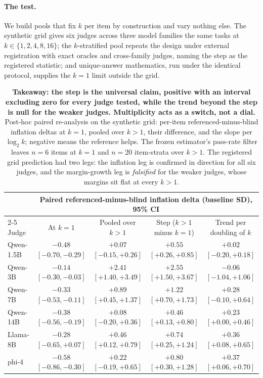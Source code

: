 \documentclass[11pt]{article}
\begin{document}
\paragraph{The test.}
We build pools that fix $k$ per item by construction and vary nothing else.
The synthetic grid gives six judges across three model families the same tasks at $k \in \{1,2,4,8,16\}$; the $k$-stratified pool repeats the design under external registration with exact oracles and cross-family judges, naming the step as the registered statistic; and unique-answer mathematics, run under the identical protocol, supplies the $k{=}1$ limit outside the grid.

\begin{table}[tbp]
\centering
\small
\setlength{\tabcolsep}{4pt}
\begin{tabular}{lcccc}
\toprule
& \multicolumn{4}{c}{Paired referenced-minus-blind inflation delta (baseline SD), 95\% CI} \\
\cmidrule(lr){2-5}
Judge & At $k{=}1$ & Pooled over $k{>}1$ & Step ($k{>}1$ minus $k{=}1$) & Trend per doubling of $k$ \\
\midrule
Qwen-1.5B & $-0.48$ {\scriptsize$[-0.70,-0.29]$} & $+0.07$ {\scriptsize$[-0.15,+0.26]$} & $+0.55$ {\scriptsize$[+0.26,+0.85]$} & $+0.02$ {\scriptsize$[-0.20,+0.18]$} \\
Qwen-3B   & $-0.14$ {\scriptsize$[-0.30,-0.03]$} & $+2.41$ {\scriptsize$[+1.40,+3.49]$} & $+2.55$ {\scriptsize$[+1.50,+3.67]$} & $-0.06$ {\scriptsize$[-1.04,+1.06]$} \\
Qwen-7B   & $-0.33$ {\scriptsize$[-0.53,-0.11]$} & $+0.89$ {\scriptsize$[+0.45,+1.37]$} & $+1.22$ {\scriptsize$[+0.70,+1.73]$} & $+0.28$ {\scriptsize$[-0.10,+0.64]$} \\
Qwen-14B  & $-0.38$ {\scriptsize$[-0.56,-0.19]$} & $+0.08$ {\scriptsize$[-0.20,+0.36]$} & $+0.46$ {\scriptsize$[+0.13,+0.80]$} & $+0.23$ {\scriptsize$[+0.00,+0.46]$} \\
Llama-8B  & $-0.28$ {\scriptsize$[-0.65,+0.07]$} & $+0.46$ {\scriptsize$[+0.12,+0.79]$} & $+0.74$ {\scriptsize$[+0.25,+1.24]$} & $+0.36$ {\scriptsize$[+0.08,+0.65]$} \\
phi-4     & $-0.58$ {\scriptsize$[-0.86,-0.30]$} & $+0.22$ {\scriptsize$[-0.19,+0.65]$} & $+0.80$ {\scriptsize$[+0.30,+1.28]$} & $+0.37$ {\scriptsize$[+0.06,+0.70]$} \\
\bottomrule
\end{tabular}
\caption{\textbf{Takeaway: the step is the universal claim, positive with an interval excluding zero for every judge tested, while the trend beyond the step is null for the weaker judges. Multiplicity acts as a switch, not a dial.}
Post-hoc paired re-analysis on the synthetic grid: per-item referenced-minus-blind inflation deltas at $k{=}1$, pooled over $k>1$, their difference, and the slope per $\log_2 k$; negative means the reference helps. The frozen estimator's pass-rate filter leaves $n{=}6$ items at $k{=}1$ and $n{=}20$ item-strata over $k>1$. The registered grid prediction had two legs: the inflation leg is confirmed in direction for all six judges, and the margin-growth leg is \emph{falsified} for the weaker judges, whose margins sit flat at every $k>1$.}
\label{tab:paired}
\end{table}
\end{document}
